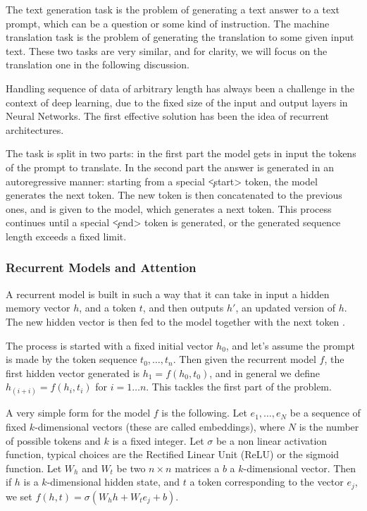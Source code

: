\documentclass[]{marticle}
\begin{document}
The text generation task is the problem of generating a text answer to a text prompt, which can be a
question or some kind of instruction. The machine translation task is the problem of generating the
translation to some given input text. These two tasks are very similar, and for clarity, we will
focus on the translation one  in the following discussion.

Handling sequence of data of arbitrary length has always been a challenge in the context of deep
learning, due to the fixed size of the input and output layers in Neural Networks. The first
effective solution has been the idea of recurrent architectures.

The task is split in two parts: in the first part the model gets in input the tokens of the prompt
to translate. In the second part the answer is generated in an autoregressive manner: starting from
a special \c{<start>} token, the model generates the next token. The new token is then concatenated to
the previous ones, and is given to the model, which generates a next token. This process continues
until a special \c{<end>} token is generated, or the generated sequence length exceeds a fixed limit.

\subsubsection{Recurrent Models and Attention}

A recurrent model is built in such a way that it can take in input a hidden memory vector $h$, and a
token $t$, and then outputs $h'$, an updated version of $h$. The new hidden vector is then fed to
the model together with the next token \cite{gated-networks}.

The process is started with a fixed initial vector $h_0$, and let's assume the prompt is made by the
token sequence $t_0, \dots, t_n$. Then given the recurrent model $f$, the first hidden vector
generated is $h_1 = f(h_0, t_0)$, and in general we define $h_(i+i) = f(h_i, t_i)$ for $i=1\dots n$.
This tackles the first part of the problem. 

A very simple form for the model $f$ is the following. Let $e_1, \dots, e_N$ be a sequence of fixed
$k$-dimensional vectors (these are called embeddings), where $N$ is the number of possible tokens
and $k$ is a fixed integer. Let $\sigma$ be a non linear activation function, typical choices are
the Rectified Linear Unit (ReLU) or the sigmoid function. Let $W_h$ and $W_t$ be two $n \times n$
matrices a $b$ a $k$-dimensional vector. Then if $h$ is a $k$-dimensional hidden state, and $t$ a
token corresponding to the vector $e_j$, we set $f(h,t) = \sigma(W_h h + W_t e_j + b)$.
\end{document}
